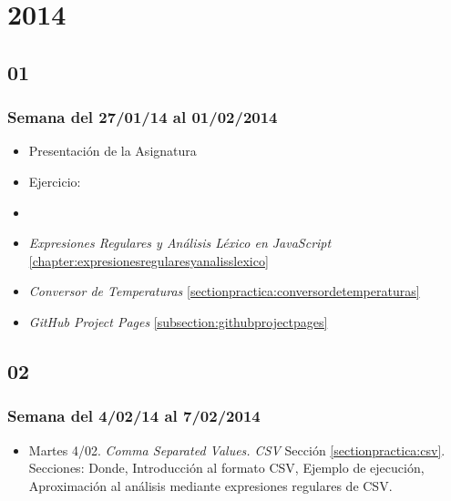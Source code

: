 \chapter{2014}

\section{01}
\subsection{Semana del 27/01/14 al 01/02/2014}
\begin{itemize}
\item Presentación de la Asignatura
\item Ejercicio: 
\item
{}
\item {\it Expresiones Regulares y Análisis Léxico en JavaScript} \ref{chapter:expresionesregularesyanalisslexico}
\item {\it Conversor de Temperaturas} \ref{sectionpractica:conversordetemperaturas}
\item {\it GitHub Project Pages} \ref{subsection:githubprojectpages}
\end{itemize}

\section{02}
\subsection{Semana del 4/02/14 al 7/02/2014}

\begin{itemize}
\item Martes 4/02.
{\it Comma Separated Values. CSV} Sección \ref{sectionpractica:csv}.
Secciones: Donde, Introducción al formato CSV, Ejemplo de ejecución,
Aproximación al análisis mediante expresiones regulares de CSV.
\end{itemize}

